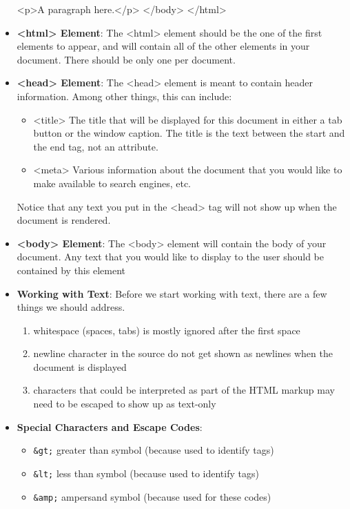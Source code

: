 \documentclass{report}
\begin{document}
\begin{itemize}
\begin{htmlcode}
                    <p>A paragraph here.</p>
                </body>
            </html>
        \end{htmlcode}
    \item \textbf{<html> Element}: The <html> element should be the one of the first elements to appear, and will contain all of the other elements in your document.
        \bigbreak \noindent 
        There should be only one per document.
    \item \textbf{<head> Element}: The <head> element is meant to contain header information. Among other things, this can include:
        \begin{itemize}
            \item <title> The title that will be displayed for this document in either a tab button or the window caption. The title is the text between the start and the end tag, not an attribute.
            \item <meta> Various information about the document that you would like to make available to search engines, etc.
        \end{itemize}
        Notice that any text you put in the <head> tag will not show up when the document is rendered.
    \item \textbf{<body> Element}: The <body> element will contain the body of your document. Any text that you would like to display to the user should be contained by this element
    \item \textbf{Working with Text}: Before we start working with text, there are a few things we should address.
        \begin{enumerate}
            \item whitespace (spaces, tabs) is mostly ignored after the first space
            \item newline character in the source do not get shown as newlines when the document is displayed
            \item characters that could be interpreted as part of the HTML markup may need to be escaped to show up as text-only
        \end{enumerate}
    \item \textbf{Special Characters and Escape Codes}:
        \begin{itemize}
            \item \texttt{\&gt;} greater than symbol (because used to identify tags)
            \item \texttt{\&lt;} less than symbol (because used to identify tags)
            \item \texttt{\&amp;} ampersand symbol (because used for these codes)

\end{itemize}
\end{itemize}
\end{document}
